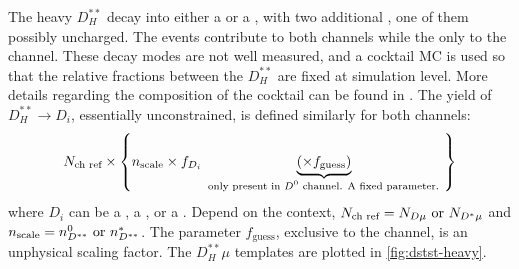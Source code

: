 The heavy $D_H^{**}$ decay into either a \Dz or a \Dstar, with two additional
\pion, one of them possibly uncharged.
The \Dstarp events contribute to both channels while the \Dstarz only to the \Dz
channel.
These decay modes are not well measured, and a cocktail MC is used so that
the relative fractions between the $D_H^{**}$ are fixed at simulation level.
More details regarding the composition of the cocktail can be found in
\cite{LHCb-ANA-2020-056}.
The yield of $D_H^{**} \rightarrow D_i$, essentially unconstrained, is defined
similarly for both channels:
\begin{equation}
    N_\text{ch ref} \times \left\{
        n_\text{scale} \times f_{D_i}
        \underbrace{(\times f_\text{guess})}_\text{
            only present in \Dz channel. A fixed parameter.
        }
    \right\}
\end{equation}
where $D_i$ can be a \Dz, a \Dstarz, or a \Dstarp.
Depend on the context,
$N_\text{ch ref} = N_{D\mu} \text{ or } N_{{{D}^*}\mu}$ and
$n_\text{scale} = n^{0}_{D^{**}} \text{ or } n_{D^{**}}^{*}$.
The parameter $f_\text{guess}$, exclusive to the \Dz channel, is an unphysical
scaling factor.
The $D_H^{**}\mu$ templates are plotted in
\cref{fig:dstst-heavy}.

